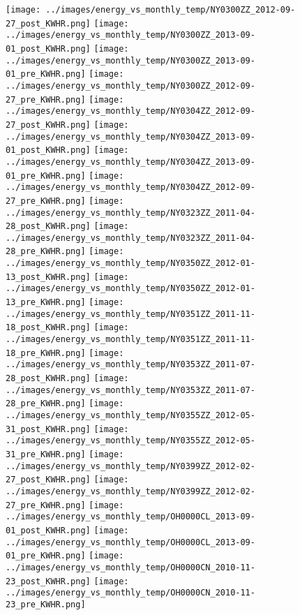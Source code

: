 \clearpage
\begin{figure}
\centering
\texttt{[image: ../images/energy\_vs\_monthly\_temp/NY0300ZZ\_2012-09-27\_post\_KWHR.png]}
\texttt{[image: ../images/energy\_vs\_monthly\_temp/NY0300ZZ\_2013-09-01\_post\_KWHR.png]}
\texttt{[image: ../images/energy\_vs\_monthly\_temp/NY0300ZZ\_2013-09-01\_pre\_KWHR.png]}
\texttt{[image: ../images/energy\_vs\_monthly\_temp/NY0300ZZ\_2012-09-27\_pre\_KWHR.png]}
\texttt{[image: ../images/energy\_vs\_monthly\_temp/NY0304ZZ\_2012-09-27\_post\_KWHR.png]}
\texttt{[image: ../images/energy\_vs\_monthly\_temp/NY0304ZZ\_2013-09-01\_post\_KWHR.png]}
\texttt{[image: ../images/energy\_vs\_monthly\_temp/NY0304ZZ\_2013-09-01\_pre\_KWHR.png]}
\texttt{[image: ../images/energy\_vs\_monthly\_temp/NY0304ZZ\_2012-09-27\_pre\_KWHR.png]}
\texttt{[image: ../images/energy\_vs\_monthly\_temp/NY0323ZZ\_2011-04-28\_post\_KWHR.png]}
\texttt{[image: ../images/energy\_vs\_monthly\_temp/NY0323ZZ\_2011-04-28\_pre\_KWHR.png]}
\texttt{[image: ../images/energy\_vs\_monthly\_temp/NY0350ZZ\_2012-01-13\_post\_KWHR.png]}
\texttt{[image: ../images/energy\_vs\_monthly\_temp/NY0350ZZ\_2012-01-13\_pre\_KWHR.png]}
\texttt{[image: ../images/energy\_vs\_monthly\_temp/NY0351ZZ\_2011-11-18\_post\_KWHR.png]}
\texttt{[image: ../images/energy\_vs\_monthly\_temp/NY0351ZZ\_2011-11-18\_pre\_KWHR.png]}
\texttt{[image: ../images/energy\_vs\_monthly\_temp/NY0353ZZ\_2011-07-28\_post\_KWHR.png]}
\texttt{[image: ../images/energy\_vs\_monthly\_temp/NY0353ZZ\_2011-07-28\_pre\_KWHR.png]}
\texttt{[image: ../images/energy\_vs\_monthly\_temp/NY0355ZZ\_2012-05-31\_post\_KWHR.png]}
\texttt{[image: ../images/energy\_vs\_monthly\_temp/NY0355ZZ\_2012-05-31\_pre\_KWHR.png]}
\texttt{[image: ../images/energy\_vs\_monthly\_temp/NY0399ZZ\_2012-02-27\_post\_KWHR.png]}
\texttt{[image: ../images/energy\_vs\_monthly\_temp/NY0399ZZ\_2012-02-27\_pre\_KWHR.png]}
\texttt{[image: ../images/energy\_vs\_monthly\_temp/OH0000CL\_2013-09-01\_post\_KWHR.png]}
\texttt{[image: ../images/energy\_vs\_monthly\_temp/OH0000CL\_2013-09-01\_pre\_KWHR.png]}
\texttt{[image: ../images/energy\_vs\_monthly\_temp/OH0000CN\_2010-11-23\_post\_KWHR.png]}
\texttt{[image: ../images/energy\_vs\_monthly\_temp/OH0000CN\_2010-11-23\_pre\_KWHR.png]}
\end{figure}

